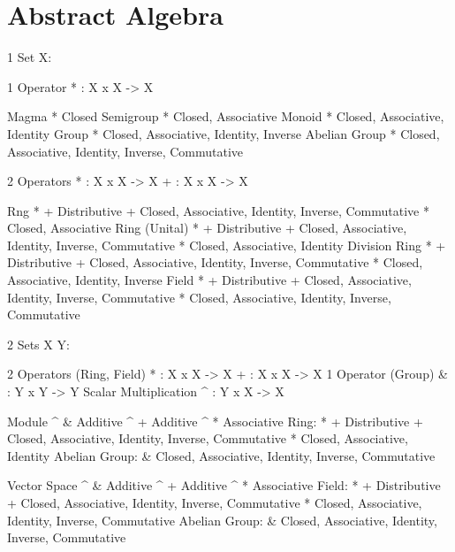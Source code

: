 \part{Abstract Algebra}\label{part:abstract_algebra}

\iffalse

1 Set X:

  1 Operator
  * : X x X -> X

    Magma         * Closed
    Semigroup     * Closed, Associative
    Monoid        * Closed, Associative, Identity
    Group         * Closed, Associative, Identity, Inverse
    Abelian Group * Closed, Associative, Identity, Inverse, Commutative

  2 Operators
  * : X x X -> X
  + : X x X -> X

    Rng           * + Distributive
                    + Closed, Associative, Identity, Inverse, Commutative
                    * Closed, Associative
    Ring (Unital) * + Distributive
                    + Closed, Associative, Identity, Inverse, Commutative
                    * Closed, Associative, Identity
    Division Ring * + Distributive
                    + Closed, Associative, Identity, Inverse, Commutative
                    * Closed, Associative, Identity, Inverse
    Field         * + Distributive
                    + Closed, Associative, Identity, Inverse, Commutative
                    * Closed, Associative, Identity, Inverse, Commutative

2 Sets X Y:

  2 Operators (Ring, Field)
  * : X x X -> X
  + : X x X -> X
  1 Operator (Group)
  & : Y x Y -> Y
  Scalar Multiplication
  ^ : Y x X -> X

    Module
                    ^ & Additive
                    ^ + Additive
                    ^ * Associative
              Ring: * + Distributive
                      + Closed, Associative, Identity, Inverse, Commutative
                      * Closed, Associative, Identity
            Abelian
             Group:   & Closed, Associative, Identity, Inverse, Commutative

    Vector Space
                    ^ & Additive
                    ^ + Additive
                    ^ * Associative
             Field: * + Distributive
                      + Closed, Associative, Identity, Inverse, Commutative
                      * Closed, Associative, Identity, Inverse, Commutative
            Abelian
             Group:   & Closed, Associative, Identity, Inverse, Commutative

